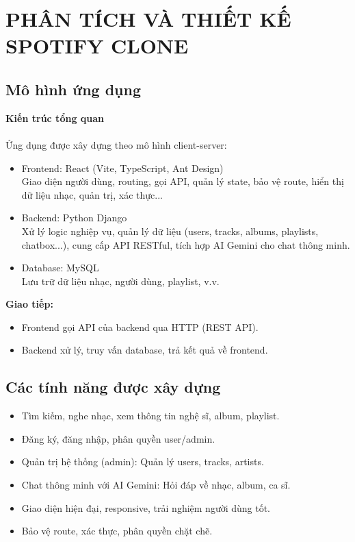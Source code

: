 \documentclass[a4paper]{article}
\begin{document}
 \section{PHÂN TÍCH VÀ THIẾT KẾ SPOTIFY CLONE}
    \subsection{Mô hình ứng dụng}
    \textbf{Kiến trúc tổng quan}\\
    \\
    Ứng dụng được xây dựng theo mô hình client-server:
    
    \begin{itemize}
        \item Frontend: React (Vite, TypeScript, Ant Design)\\
        Giao diện người dùng, routing, gọi API, quản lý state, bảo vệ route, hiển thị dữ liệu nhạc, quản trị, xác thực...
        \item Backend: Python Django\\
        Xử lý logic nghiệp vụ, quản lý dữ liệu (users, tracks, albums, playlists, chatbox...), cung cấp API RESTful, tích hợp AI Gemini cho chat thông minh.
        \item Database: MySQL\\
        Lưu trữ dữ liệu nhạc, người dùng, playlist, v.v.
    \end{itemize}
    \textbf{Giao tiếp:}
    \begin{itemize}
        \item Frontend gọi API của backend qua HTTP (REST API).
        \item Backend xử lý, truy vấn database, trả kết quả về frontend.
    \end{itemize}

    
    \subsection{Các tính năng được xây dựng}
    \begin{itemize}
        \item Tìm kiếm, nghe nhạc, xem thông tin nghệ sĩ, album, playlist.
        \item Đăng ký, đăng nhập, phân quyền user/admin.
        \item Quản trị hệ thống (admin): Quản lý users, tracks, artists.
        \item Chat thông minh với AI Gemini: Hỏi đáp về nhạc, album, ca sĩ.
        \item Giao diện hiện đại, responsive, trải nghiệm người dùng tốt.
        \item Bảo vệ route, xác thực, phân quyền chặt chẽ.
    \end{itemize}
\end{document}
